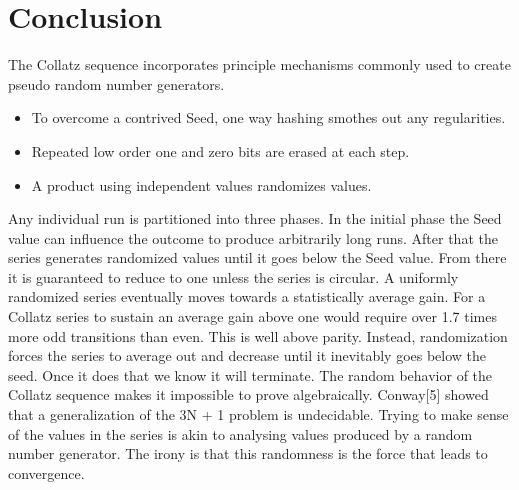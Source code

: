 \documentclass[preprint]{sigplanconf}
\begin{document}
\section{Conclusion}

The Collatz sequence incorporates principle mechanisms commonly used to create pseudo random number generators.

\begin{itemize}
    \item To overcome a contrived Seed, one way hashing smothes out any regularities.
    \item Repeated low order one and zero bits are erased at each step.
    \item A product using independent values randomizes values.
\end{itemize}
Any individual run is partitioned into three phases. In the initial phase the Seed value can influence the outcome to produce arbitrarily long runs. After that the series generates randomized values until it goes below the Seed value. From there it is guaranteed to reduce to one unless the series is circular.
A uniformly randomized series eventually moves towards a statistically average gain. For a Collatz series to sustain an average gain above one would require over 1.7 times more odd transitions than even. This is well above parity. Instead, randomization forces the series to average out and decrease until it inevitably goes below the seed. Once it does that we know it will terminate.
The random behavior of the Collatz sequence makes it impossible to prove algebraically. Conway[5] showed that a generalization of the 3N + 1 problem is undecidable. Trying to make sense of the values in the series is akin to analysing values produced by a random number generator. The irony is that this randomness is the force that leads to convergence.
\end{document}
